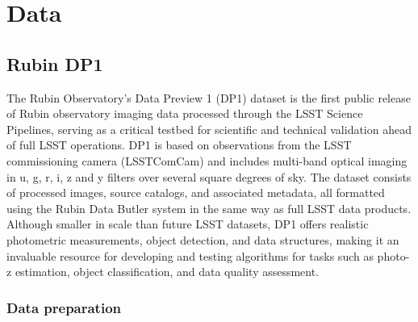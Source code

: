 
\section{Data}
\label{sec:data:0}

\subsection{Rubin DP1}
\label{sec:data:dp1}

The Rubin Observatory’s Data Preview 1 (DP1) dataset is the first public release of Rubin observatory imaging data processed through the LSST Science Pipelines, serving as a critical testbed for scientific and technical validation ahead of full LSST operations.  DP1 is based on observations from the LSST commissioning camera (LSSTComCam) and includes multi-band optical imaging in u, g, r, i, z and y filters over several square degrees of sky.  The dataset consists of processed images, source catalogs, and associated metadata, all formatted using the Rubin Data Butler system in the same way as full LSST data products.  Although smaller in scale than future LSST datasets, DP1 offers realistic photometric measurements, object detection, and data structures, making it an invaluable resource for developing and testing algorithms for tasks such as photo-z estimation, object classification, and data quality assessment.


\subsubsection{Data preparation}
\label{sec:data:dp1:preparation}

